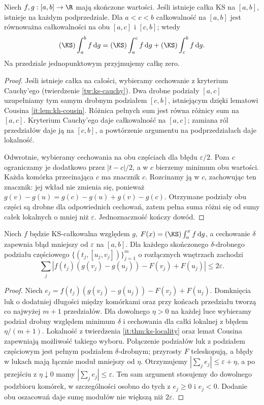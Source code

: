 \begin{twierdzenie}\label{it:thm:ks-locality}
Niech $f,g:[a,b]\to\R$ mają skończone wartości. Jeśli istnieje
całka KS na $[a,b]$, istnieje na każdym podprzedziale.
Dla $a<c<b$ całkowalność na $[a,b]$ jest równoważna
całkowalności na obu $[a,c]$ i $[c,b]$; wtedy
\[
 (\KS)\int_a^b f\,\mathrm dg=
 (\KS)\int_a^c f\,\mathrm dg+(\KS)\int_c^b f\,\mathrm dg.
\]
Na przedziale jednopunktowym przyjmujemy całkę zero.
\end{twierdzenie}
\begin{proof}
Jeśli istnieje całka na całości, wybieramy cechowanie z kryterium
Cauchy'ego (twierdzenie \ref{tw:ks-cauchy}). Dwa drobne podziały
$[a,c]$ uzupełniamy tym samym drobnym podziałem $[c,b]$,
istniejącym dzięki lematowi Cousina \ref{it:lem:kh-cousin}.
Różnica pełnych sum jest równa różnicy sum na $[a,c]$.
Kryterium Cauchy'ego daje całkowalność na $[a,c]$; zamiana ról
przedziałów daje ją na $[c,b]$, a powtórzenie argumentu na
podprzedziałach daje lokalność.

Odwrotnie, wybieramy cechowania na obu częściach dla błędu
$\varepsilon/2$. Poza $c$ ograniczamy je dodatkowo przez
$|t-c|/2$, a w $c$ bierzemy minimum obu wartości.
Każda komórka przecinająca $c$ ma znacznik $c$. Rozcinamy
ją w $c$, zachowując ten znacznik: jej wkład nie zmienia
się, ponieważ $g(v)-g(u)=g(c)-g(u)+g(v)-g(c)$.
Otrzymane podziały obu części są drobne dla odpowiednich
cechowań, zatem pełna suma różni się od sumy całek lokalnych
o mniej niż $\varepsilon$. Jednoznaczność kończy dowód.
\end{proof}

\begin{lemat}\label{it:lem:ks-saks-henstock}
Niech $f$ będzie KS-całkowalna względem $g$,
$F(x)=(\KS)\int_a^x f\,\mathrm dg$, a cechowanie $\delta$
zapewnia błąd mniejszy od $\varepsilon$ na $[a,b]$.
Dla każdego skończonego $\delta$-drobnego podziału
częściowego $\{(t_j,[u_j,v_j])\}_{j=1}^m$ o rozłącznych
wnętrzach zachodzi
\[
 \sum_j|f(t_j)(g(v_j)-g(u_j))-F(v_j)+F(u_j)|
 \le 2\varepsilon.
\]
\end{lemat}
\begin{proof}
Niech $e_j=f(t_j)(g(v_j)-g(u_j))-F(v_j)+F(u_j)$.
Domknięcia luk o dodatniej długości między komórkami
oraz przy końcach przedziału tworzą co najwyżej $m+1$
przedziałów. Dla dowolnego $\eta>0$ na każdej luce
wybieramy podział drobny względem minimum $\delta$ i
cechowania dla całki lokalnej z błędem $\eta/(m+1)$.
Lokalność z twierdzenia \ref{it:thm:ks-locality} oraz
lemat Cousina zapewniają możliwość takiego wyboru.
Połączenie podziałów luk z podziałem częściowym jest
pełnym podziałem $\delta$-drobnym; przyrosty $F$ teleskopują,
a błędy w lukach mają łącznie moduł mniejszy od $\eta$.
Otrzymujemy $|\sum_j e_j|\le\varepsilon+\eta$,
a po przejściu z $\eta\downarrow0$ mamy
$|\sum_j e_j|\le\varepsilon$.
Ten sam argument stosujemy do dowolnego podzbioru komórek,
w szczególności osobno do tych z $e_j\ge0$ i $e_j<0$.
Dodanie obu oszacowań daje sumę modułów nie większą niż
$2\varepsilon$.
\end{proof}

